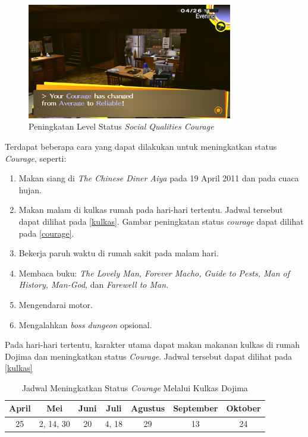 \begin{figure}[htbp]
    \centering
    \includegraphics[width=0.8\textwidth]{resources/Dokumentasi/Screenshot (381).png}
    \caption{\label{courage}Peningkatan Level Status \textit{Social Qualities Courage}}
\end{figure}

Terdapat beberapa cara yang dapat dilakukan untuk meningkatkan status \textit{Courage}, seperti:
\begin{enumerate}
    \item Makan siang di \textit{The Chinese Diner Aiya} pada 19 April 2011 dan pada cuaca hujan.
    \item Makan malam di kulkas rumah pada hari-hari tertentu. Jadwal tersebut dapat dilihat pada \autoref{kulkas}. Gambar peningkatan status \textit{courage} dapat dilihat pada \autoref{courage}.
    \item Bekerja paruh waktu di rumah sakit pada malam hari.
    \item Membaca buku: \textit{The Lovely Man, Forever Macho, Guide to Pests, Man of History, Man-God}, dan \textit{Farewell to Man.}
    \item Mengendarai motor.
    \item Mengalahkan \textit{boss dungeon} opsional.
\end{enumerate}

Pada hari-hari tertentu, karakter utama dapat makan makanan kulkas di rumah Dojima dan meningkatkan status \textit{Courage}. Jadwal tersebut dapat dilihat pada \autoref{kulkas}
\begin{table}[htb]
    \caption{\label{kulkas}Jadwal Meningkatkan Status \textit{Courage} Melalui Kulkas Dojima}
    \begin{center}
        \begin{tabular}{ | c | c | c | c | c | c | c | }
            \hline
            \textbf{April} & \textbf{Mei} & \textbf{Juni} & \textbf{Juli} & \textbf{Agustus} & \textbf{September} & \textbf{Oktober} \\
            \hline
            25             & 2, 14, 30    & 20            & 4, 18         & 29               & 13                 & 24               \\
            \hline
        \end{tabular}
    \end{center}
\end{table}


